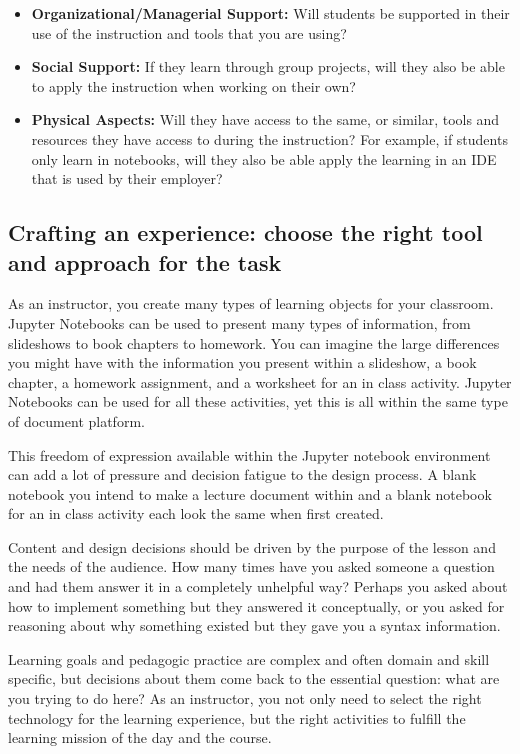\documentclass[]{book}
\providecommand{\tightlist}{%
  \setlength{\itemsep}{0pt}\setlength{\parskip}{0pt}}
\begin{document}
\begin{itemize}
\tightlist
\item
  \textbf{Organizational/Managerial Support:} Will students be supported
  in their use of the instruction and tools that you are using?
\item
  \textbf{Social Support:} If they learn through group projects, will
  they also be able to apply the instruction when working on their own?
\item
  \textbf{Physical Aspects:} Will they have access to the same, or
  similar, tools and resources they have access to during the
  instruction? For example, if students only learn in notebooks, will
  they also be able apply the learning in an IDE that is used by their
  employer?
\end{itemize}

\subsection{Crafting an experience: choose the right tool and approach
for the
task}\label{crafting-an-experience-choose-the-right-tool-and-approach-for-the-task}

As an instructor, you create many types of learning objects for your
classroom. Jupyter Notebooks can be used to present many types of
information, from slideshows to book chapters to homework. You can
imagine the large differences you might have with the information you
present within a slideshow, a book chapter, a homework assignment, and a
worksheet for an in class activity. Jupyter Notebooks can be used for
all these activities, yet this is all within the same type of document
platform.

This freedom of expression available within the Jupyter notebook
environment can add a lot of pressure and decision fatigue to the design
process. A blank notebook you intend to make a lecture document within
and a blank notebook for an in class activity each look the same when
first created.

Content and design decisions should be driven by the purpose of the
lesson and the needs of the audience. How many times have you asked
someone a question and had them answer it in a completely unhelpful way?
Perhaps you asked about how to implement something but they answered it
conceptually, or you asked for reasoning about why something existed but
they gave you a syntax information.

Learning goals and pedagogic practice are complex and often domain and
skill specific, but decisions about them come back to the essential
question: what are you trying to do here? As an instructor, you not only
need to select the right technology for the learning experience, but the
right activities to fulfill the learning mission of the day and the
course.
\end{document}
